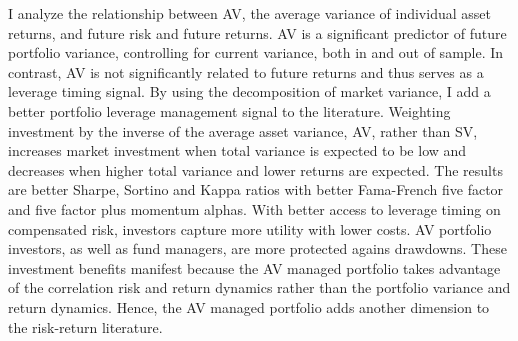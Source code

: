 I analyze the relationship between AV, the average variance of individual asset returns, and future risk and future returns. AV is a significant predictor of future portfolio variance, controlling for current variance, both in and out of sample. In contrast, AV is not significantly related to future returns and thus serves as a leverage timing signal. By using the decomposition of market variance, I add a better portfolio leverage management signal to the literature. Weighting investment by the inverse of the average asset variance, AV, rather than SV, increases market investment when total variance is expected to be low and decreases when higher total variance and lower returns are expected. The results are better Sharpe, Sortino and Kappa ratios with better Fama-French five factor and five factor plus momentum alphas. With better access to leverage timing on compensated risk, investors capture more utility with lower costs. AV portfolio investors, as well as fund managers, are more protected agains drawdowns. These investment benefits manifest because the AV managed portfolio takes advantage of the  correlation risk and return dynamics rather than the portfolio variance and return dynamics. Hence, the AV managed portfolio adds another dimension to the risk-return literature.

